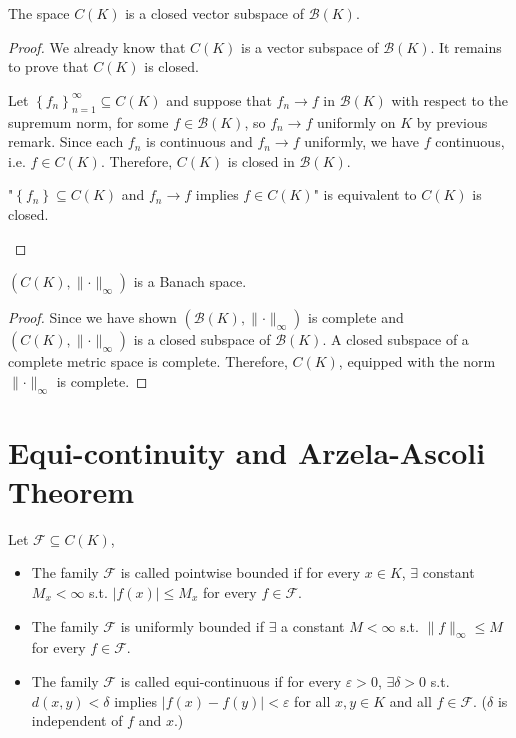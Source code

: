 \begin{proposition}
    The space \(C(K)\) is a closed vector subspace of \(\mathcal{B} (K)\).   
\end{proposition}
\begin{proof}
    We already know that \(C(K)\) is a vector subspace of \(\mathcal{B} (K)\). It remains to prove that \(C(K)\) is closed. 

    Let \(\left\{ f_n \right\}_{n=1}^{\infty} \subseteq C(K) \) and suppose that \(f_n \to f\) in \(\mathcal{B} (K)\) with respect to the supremum norm, for some \(f \in \mathcal{B} (K)\), so \(f_n \to f\) uniformly on \(K\) by previous remark. Since each \(f_n\) is continuous and \(f_n \to f\) uniformly, we have \(f\) continuous, i.e. \(f \in C(K)\). Therefore, \(C(K)\) is closed in \(\mathcal{B}(K)\).

    \begin{remark}
        "\(\left\{ f_n \right\}  \subseteq C(K)\) and \(f_n \to f\) implies \(f \in C(K)\)" is equivalent to \(C(K)\) is closed.    
    \end{remark}          
\end{proof}

\begin{proposition}
    \((C (K), \lVert \cdot \rVert_{\infty })\) is a Banach space.
\end{proposition}
\begin{proof}
    Since we have shown \((\mathcal{B} (K), \lVert \cdot \rVert_\infty  )\) is complete and \((C(K), \lVert \cdot \rVert_\infty )\) is a closed subspace of \(\mathcal{B} (K)\). A closed subspace of a complete metric space is complete. Therefore, \(C(K)\), equipped with the norm \(\lVert \cdot \rVert_\infty  \) is complete.    
\end{proof}

\section{Equi-continuity and Arzela-Ascoli Theorem}
\begin{definition}
    Let \(\mathcal{F} \subseteq C(K)\),
    \begin{itemize}
        \item [(i)] The family \(\mathcal{F}\) is called pointwise bounded if for every \(x \in K\), \(\exists \) constant \(M_x < \infty\) s.t. \(\vert f(x) \vert \le M_x \) for every \(f \in \mathcal{F}\). 
        \item [(ii)] The family \(\mathcal{F}\) is uniformly bounded if \(\exists \) a constant \(M < \infty\) s.t. \(\lVert f \rVert _\infty \le M \) for every \(f \in \mathcal{F}\).
        \item [(iii)] The family \(\mathcal{F}\) is called equi-continuous if for every \(\varepsilon > 0\), \(\exists \delta > 0\) s.t. \(d(x, y) < \delta\) implies \(\vert f(x) - f(y) \vert < \varepsilon \) for all \(x, y \in K\) and all \(f \in \mathcal{F} \). (\(\delta \) is independent of \(f\) and \(x\).)                   
    \end{itemize} 
\end{definition}

